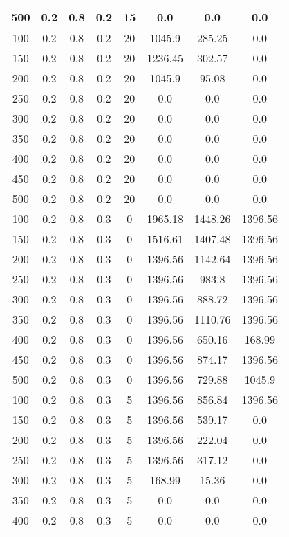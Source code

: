 \documentclass[a4paper, 12pt]{extreport}
\begin{document}
\begin{itemize}
\begin{longtable}{|c|c|c|c|c|c|c|c|}
			500 & 0.2 & 0.8 & 0.2 & 15 & 0.0 & 0.0 & 0.0 \\\hline
			100 & 0.2 & 0.8 & 0.2 & 20 & 1045.9 & 285.25 & 0.0 \\\hline
			150 & 0.2 & 0.8 & 0.2 & 20 & 1236.45 & 302.57 & 0.0 \\\hline
			200 & 0.2 & 0.8 & 0.2 & 20 & 1045.9 & 95.08 & 0.0 \\\hline
			250 & 0.2 & 0.8 & 0.2 & 20 & 0.0 & 0.0 & 0.0 \\\hline
			300 & 0.2 & 0.8 & 0.2 & 20 & 0.0 & 0.0 & 0.0 \\\hline
			350 & 0.2 & 0.8 & 0.2 & 20 & 0.0 & 0.0 & 0.0 \\\hline
			400 & 0.2 & 0.8 & 0.2 & 20 & 0.0 & 0.0 & 0.0 \\\hline
			450 & 0.2 & 0.8 & 0.2 & 20 & 0.0 & 0.0 & 0.0 \\\hline
			500 & 0.2 & 0.8 & 0.2 & 20 & 0.0 & 0.0 & 0.0 \\\hline
			100 & 0.2 & 0.8 & 0.3 & 0 & 1965.18 & 1448.26 & 1396.56 \\\hline
			150 & 0.2 & 0.8 & 0.3 & 0 & 1516.61 & 1407.48 & 1396.56 \\\hline
			200 & 0.2 & 0.8 & 0.3 & 0 & 1396.56 & 1142.64 & 1396.56 \\\hline
			250 & 0.2 & 0.8 & 0.3 & 0 & 1396.56 & 983.8 & 1396.56 \\\hline
			300 & 0.2 & 0.8 & 0.3 & 0 & 1396.56 & 888.72 & 1396.56 \\\hline
			350 & 0.2 & 0.8 & 0.3 & 0 & 1396.56 & 1110.76 & 1396.56 \\\hline
			400 & 0.2 & 0.8 & 0.3 & 0 & 1396.56 & 650.16 & 168.99 \\\hline
			450 & 0.2 & 0.8 & 0.3 & 0 & 1396.56 & 874.17 & 1396.56 \\\hline
			500 & 0.2 & 0.8 & 0.3 & 0 & 1396.56 & 729.88 & 1045.9 \\\hline
			100 & 0.2 & 0.8 & 0.3 & 5 & 1396.56 & 856.84 & 1396.56 \\\hline
			150 & 0.2 & 0.8 & 0.3 & 5 & 1396.56 & 539.17 & 0.0 \\\hline
			200 & 0.2 & 0.8 & 0.3 & 5 & 1396.56 & 222.04 & 0.0 \\\hline
			250 & 0.2 & 0.8 & 0.3 & 5 & 1396.56 & 317.12 & 0.0 \\\hline
			300 & 0.2 & 0.8 & 0.3 & 5 & 168.99 & 15.36 & 0.0 \\\hline
			350 & 0.2 & 0.8 & 0.3 & 5 & 0.0 & 0.0 & 0.0 \\\hline
			400 & 0.2 & 0.8 & 0.3 & 5 & 0.0 & 0.0 & 0.0 \\\hline

\end{longtable}
\end{itemize}
\end{document}
